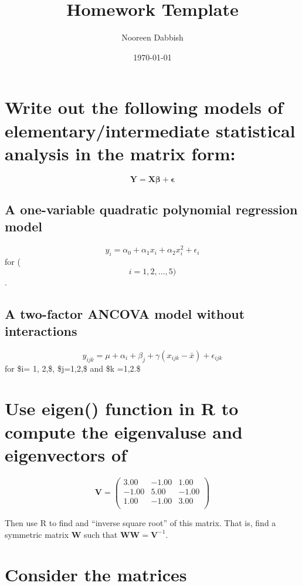 \documentclass[11pt]{article}
\title{Homework Template}
\author{Nooreen Dabbish}
\date{\today}
\begin{document}
\maketitle


\section{Write out the following models of elementary/intermediate statistical analysis in the matrix form:}
\label{sec-1}

$$ \bm{Y} = \bm{X\beta} +\bm{\epsilon} $$
\subsection{A one-variable quadratic polynomial regression model}
\label{sec-1-1}

$$y_i = \alpha_0 + \alpha_1x_i + \alpha_2 x_i^2 + \epsilon_i $$ for ($$i = 1,2,\ldots,5)$$. 
\subsection{A two-factor ANCOVA model without interactions}
\label{sec-1-2}

$$y_{ijk} = \mu + \alpha_i + \beta_j + \gamma(x_{ijk} - \bar{x}) +
\epsilon_{ijk}$$
for \$i= 1, 2,\$, \$j=1,2,\$ and \$k =1,2.\$
\section{Use eigen() function in R to compute the eigenvaluse and eigenvectors of}
\label{sec-2}




$$\mathbf{V}=
\begin{pmatrix}{}
  3.00 & -1.00 & 1.00 \\ 
  -1.00 & 5.00 & -1.00 \\ 
  1.00 & -1.00 & 3.00 \\ 
  \end{pmatrix}
$$

Then use R to find and ``inverse square root'' of this matrix.
That is, find a symmetric matrix $\mathbf{W}$ such that
$\mathbf{WW}=\mathbf{V}^{-1}$.
\section{Consider the matrices}
\label{sec-3}
\end{document}
